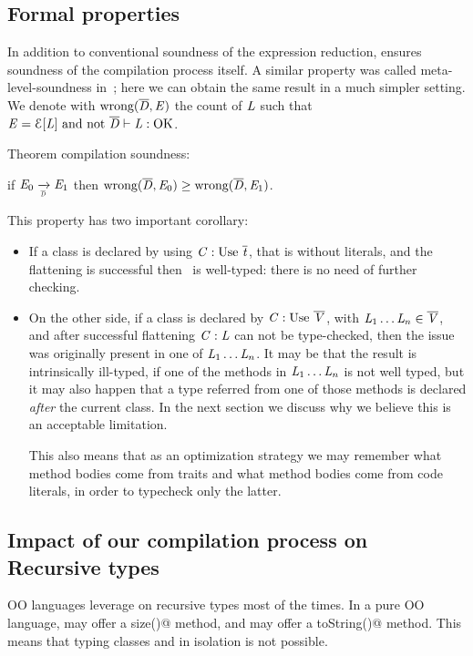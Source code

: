\subsection{Formal properties}
In addition to conventional soundness of the expression reduction,
\name ensures soundness of the compilation process itself.
A similar property was called meta-level-soundness in~\cite{}; here we can obtain the same result in
a much simpler setting.
We denote with $\text{wrong}(\overline{\mathit{D}},\mathit{E})$ the count of $\mathit{L}$ such that
$\mE=\ctx[\mL]\ \text{and not}\ \overline\mD\vdash\mL:\text{OK}$.

Theorem compilation soundness:

if $\mE_0 \xrightarrow[\smallDs]{} \mE_1$
then $\text{wrong}(\overline{\mathit{D}},\mathit{E}_0)\geq\text{wrong}(\overline{\mathit{D}},\mathit{E}_1)$.

This property has two important corollary:
\begin{itemize}
\item If a class is declared by using $\mC : \use\ \overline\mt$, that is without literals,
and the flattening is successful then \mC\ is well-typed: there is no need of further checking.
\item On the other side, if a class is declared by $\mC : \use\ \overline\mV$, with
$\mathit{L}_1\ldots\mathit{L}_n \in \overline{\mathit{V}}$, and after successful flattening $\mathit{C} : \mathit{L}$ can not be type-checked,
then the issue was originally present in one of $\mathit{L}_1\ldots\mathit{L}_n$.
It may be that the result is intrinsically ill-typed, if one of the methods in $\mathit{L}_1\ldots\mathit{L}_n$ is not well typed,
but it may also happen that a type referred from one of those methods
is declared \emph{after} the current class. 
In the next section we discuss why we believe this is an acceptable limitation.

This also means that as an optimization strategy
 we may remember what method bodies come from traits and what method bodies come from code literals, in order to typecheck only the latter.
 \end{itemize}






\subsection{Impact of our compilation process on Recursive types}
OO languages leverage on recursive types most of the times.
In a pure OO language, \Q@String@ may offer a \Q@Int size()@
method, and \Q@Int@ may offer a \Q@String toString()@ method.
This means that typing classes 
\Q@String@ and \Q@Int@ in isolation is not possible.

